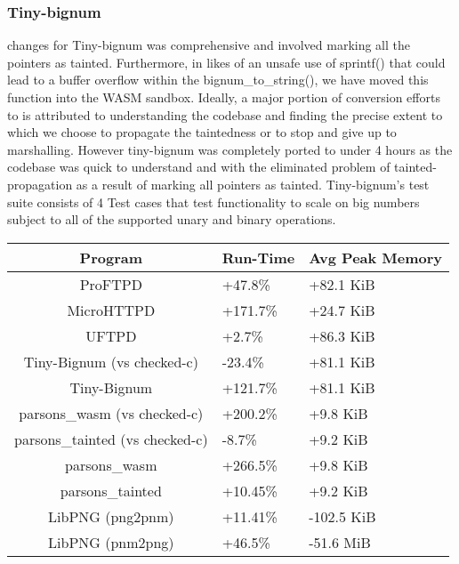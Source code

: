 \subsubsection{Tiny-bignum}
\systemname changes for Tiny-bignum was comprehensive and involved marking all the pointers as tainted. Furthermore, in likes of an unsafe use of sprintf() that could lead to a buffer overflow within the bignum\_to\_string(), we have moved this function into the WASM sandbox. Ideally, a major portion of conversion efforts to \systemname is attributed to understanding the codebase and finding the precise extent to which we choose to propagate the taintedness or to stop and give up to marshalling. However tiny-bignum was completely ported to \systemname under 4 hours as the codebase was quick to understand and with the eliminated problem of tainted-propagation as a result of marking all pointers as tainted. Tiny-bignum's test suite consists of 4 Test cases that test functionality to scale on big numbers subject to all of the supported unary and binary operations.  

\begin{center}
\begin{tabular}{||c | p{1.3cm} | p{1.8cm}||} 
 \hline
 Program & Run-Time & Avg Peak Memory \\ [0.5ex] 
 \hline\hline
 ProFTPD & +47.8\% & +82.1 KiB  \\
 MicroHTTPD & +171.7\% & +24.7 KiB\\ 
 UFTPD & +2.7\% & +86.3 KiB \\ 
 Tiny-Bignum (vs checked-c) & -23.4\% &  +81.1 KiB \\
 Tiny-Bignum &  +121.7\% &  +81.1 KiB \\
 parsons\_wasm (vs checked-c) & +200.2\% & +9.8 KiB\\ 
 parsons\_tainted (vs checked-c) & -8.7\% & +9.2 KiB\\
 parsons\_wasm & +266.5\% & +9.8 KiB\\ 
 parsons\_tainted & +10.45\% & +9.2 KiB\\ 
 LibPNG (png2pnm) & +11.41\% & -102.5 KiB\\ 
 LibPNG (pnm2png) & +46.5\% & -51.6 MiB\\ [1ex]
 \hline 
\end{tabular}
\end{center}



